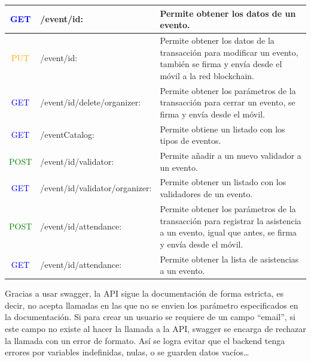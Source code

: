 \begin{center}
\begin{longtable}{|c|l|m{23em}|}
    \hline
    \textcolor{blue}{{\footnotesize GET}} & /event/{id}: & Permite obtener los datos de un evento. \\
    \hline
    \textcolor{orange}{{\footnotesize PUT}} & /event/{id}: & Permite obtener los datos de la transacción para modificar un evento, también se firma y envía desde el móvil a la red blockchain.  \\
    \hline
    \textcolor{blue}{{\footnotesize GET}} & /event/{id}/delete/{organizer}: & Permite obtener los parámetros de la transacción para cerrar un evento, se firma y envía desde el móvil. \\
    \hline
    \textcolor{blue}{{\footnotesize GET}} & /eventCatalog: & Permite obtiene un listado con los tipos de eventos.  \\
    \hline
    \textcolor{green}{{\footnotesize POST}} & /event/{id}/validator: & Permite añadir a un nuevo validador a un evento. \\
    \hline
    \textcolor{blue}{{\footnotesize GET}} & /event/{id}/validator/{organizer}: & Permite obtener un listado con los validadores de un evento.  \\
    \hline
    \textcolor{green}{{\footnotesize POST}} & /event/{id}/attendance: & Permite obtener los parámetros de la transacción para registrar la asistencia a un evento, igual que antes, se firma y envía desde el móvil.  \\
    \hline
    \textcolor{blue}{{\footnotesize GET}} & /event/{id}/attendance: & Permite obtener la lista de asistencias a un evento.  \\
    \hline
  \end{longtable}
\end{center}

Gracias a usar swagger, la API sigue la documentación de forma estricta, es decir, no acepta llamadas en las que no se envien los parámetro especificados en la documentación. Si para crear un usuario se requiere de un campo ``email'', si este campo no existe al hacer la llamada a la API, swagger se encarga de rechazar la llamada con un error de formato. Así se logra evitar que el backend tenga errores por variables indefinidas, nulas, o se guarden datos vacíos\dots

